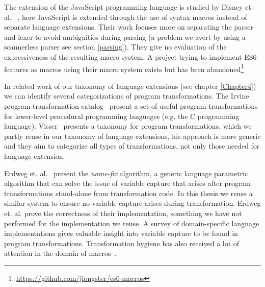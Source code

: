 The extension of the JavaScript programming language is studied by Disney et. al. ~\cite{Disney2014}, here JavaScript is extended through the use of syntax macros instead of separate language extensions. Their work focuses more on separating the parser and lexer to avoid ambiguities during parsing (a problem we avert by using a scannerless parser see section \ref{parsing}). They give no evaluation of the expressiveness of the resulting macro system. A project trying to implement ES6 features as macros using their macro system exists but has been abandoned\footnote{\url{https://github.com/jlongster/es6-macros}}

In related work of our taxonomy of language extensions (see chapter \ref{Chapter4}) we can identify several categorizations of program transformations. The Irvine program transformation catalog~\cite{Standish1976} present a set of useful program transformations for lower-level procedural programming languages (e.g. the C programming language). Visser~\cite{Visser2001} presents a taxonomy for program transformations, which we partly reuse in our taxonomy of language extensions, his approach is more generic and they aim to categorize all types of transformations, not only those needed for language extension.

Erdweg et. al.~\cite{Erdweg2014} present the \textit{name-fix} algorithm, a generic language parametric algorithm that can solve the issue of variable capture that arises after program transformations stand-alone from transformation code. In this thesis we reuse a similar system to ensure no variable capture arises during transformation. Erdweg et. al. prove the correctness of their implementation, something we have not performed for the implementation we reuse. A survey of domain-specific language implementations gives valuable insight into variable capture to be found in program transformations. Transformation hygiene has also received a lot of attention in the domain of macros~\cite{Kohlbecker1986,Herman2010a,Disney2014}. 
